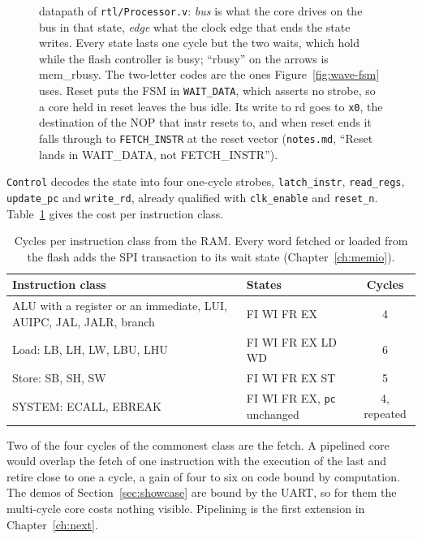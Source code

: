 \documentclass[11pt,a4paper]{report}
\newcommand{\notes}[1]{(\texttt{notes.md}, ``#1'')}
\begin{document}
\begin{figure}[!ht]
{    datapath of \texttt{rtl/Processor.v}: \emph{bus} is what the core drives on the bus in
    that state, \emph{edge} what the clock edge that ends the state writes. Every state lasts
    one cycle but the two waits, which hold while the flash controller is busy; ``rbusy'' on
    the arrows is mem\_rbusy. The two-letter codes are the ones Figure~\ref{fig:wave-fsm}
    uses. Reset puts the FSM in \texttt{WAIT\_DATA}, which asserts no strobe, so a core held
    in reset leaves the bus idle. Its write to rd goes to \texttt{x0}, the destination of the NOP that instr resets
    to, and when reset ends it falls through to \texttt{FETCH\_INSTR} at the reset vector
    \notes{Reset lands in WAIT\_DATA, not FETCH\_INSTR}.}
  \label{fig:fsm}
\end{figure}

\texttt{Control} decodes the state into four one-cycle strobes, \texttt{latch\_instr},
\texttt{read\_regs}, \texttt{update\_pc} and \texttt{write\_rd}, already qualified with
\texttt{clk\_enable} and \texttt{reset\_n}. Table~\ref{tab:cycles} gives the cost per
instruction class.

\begin{table}[!ht]
  \centering
  \begin{tabular}{@{}p{6.4cm}lc@{}}
    \toprule
    Instruction class & States & Cycles \\
    \midrule
    ALU with a register or an immediate, LUI, AUIPC, JAL, JALR, branch & FI WI FR EX & 4 \\
    Load: LB, LH, LW, LBU, LHU & FI WI FR EX LD WD & 6 \\
    Store: SB, SH, SW & FI WI FR EX ST & 5 \\
    SYSTEM: ECALL, EBREAK & FI WI FR EX, \texttt{pc} unchanged & 4, repeated \\
    \bottomrule
  \end{tabular}
  \caption{Cycles per instruction class from the RAM. Every word fetched or loaded from the
    flash adds the SPI transaction to its wait state (Chapter~\ref{ch:memio}).}
  \label{tab:cycles}
\end{table}

Two of the four cycles of the commonest class are the fetch. A pipelined core would overlap
the fetch of one instruction with the execution of the last and retire close to one a cycle,
a gain of four to six on code bound by computation. The demos of Section~\ref{sec:showcase} are
bound by the UART, so for them the multi-cycle core costs nothing visible. Pipelining is the
first extension in Chapter~\ref{ch:next}.
\end{document}
